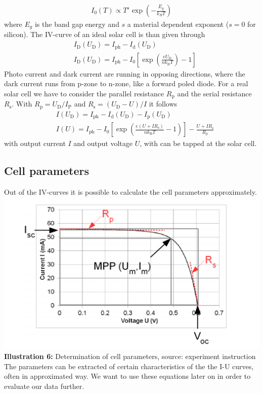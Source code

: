 \documentclass[a4paper, 12pt]{scrartcl}
\begin{document}
\begin{align}
I_0(T) \propto T^s \exp \left( - \frac{E_g}{k_B T} \right) 
\end{align}
where $E_g$ is the band gap energy and $s$ a material dependent exponent ($s=0$ for silicon). The IV-curve of an ideal solar cell is than given through 
\begin{align}
&\ I_\textrm{D}(U_\textrm{D}) = I_\textrm{ph} - I_\textrm{d}(U_\textrm{D})
\\ &\ I_\textrm{D}(U_\textrm{D}) = I_\textrm{ph} - I_0 \left[ \exp \left( \frac{e U_\textrm{D}}{nk_\textrm{B}T}\right) -1 \right]
\end{align}
Photo current and dark current are running in opposing directions, where the dark current runs from p-zone to n-zone, like a forward poled diode. For a real solar cell we have to consider the parallel resistance $R_\textrm{p}$ and the serial resistance $R_\textrm{s}$. With $R_\textrm{p} = U_\textrm{D}/ I_\textrm{P}$ and $R_\textrm{s}= (U_\textrm{D}-U)/I$ it follows
\begin{align}
&\ I(U_\textrm{D}) = I_\textrm{ph} -I_\textrm{d}(U_\textrm{D}) -I_\textrm{p}(U_\textrm{D}) \\ &\ 
I(U) = I_\textrm{ph}-I_0 \left[ \exp \left( \frac{e(U+IR_\textrm{s})}{nk_\textrm{B}T} -1 \right) \right] - \frac{U +IR_\textrm{s}}{R_\textrm{p}}
\end{align}
with output current $I$ and output voltage $U$, with can be tapped at the solar cell. 
\subsection{Cell parameters}
Out of the IV-curves it is possible to calculate the cell parameters approximately. 
\newline 
\hspace*{+3cm}
\includegraphics[scale=0.5]{szpic62}
\newline 
\textbf{Illustration 6:} Determination of cell parameters, source: experiment instruction
\newline 
\newpage
The parameters can be extracted of certain characteristics of the the I-U curves, often in approximated way. We want to use these equations later on in order to evaluate our data further.
\end{document}
